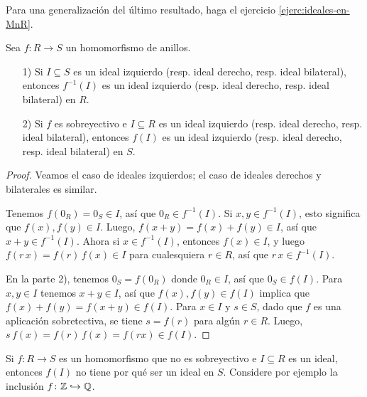 Para una generalización del último resultado, haga el ejercicio
\ref{ejerc:ideales-en-MnR}.

\begin{observacion}
  \label{obs:imagen-y-preimagen-de-un-ideal}
  Sea $f\colon R\to S$ un homomorfismo de anillos.

  \begin{enumerate}
  \item[1)] Si $I \subseteq S$ es un ideal izquierdo (resp. ideal derecho,
    resp. ideal bilateral), entonces $f^{-1} (I)$ es un ideal izquierdo
    (resp. ideal derecho, resp. ideal bilateral) en $R$.

  \item[2)] Si $f$ es sobreyectivo e $I \subseteq R$ es un ideal izquierdo
    (resp. ideal derecho, resp. ideal bilateral), entonces $f (I)$ es un ideal
    izquierdo (resp. ideal derecho, resp. ideal bilateral) en $S$.
  \end{enumerate}

  \begin{proof}
    Veamos el caso de ideales izquierdos; el caso de ideales derechos
    y bilaterales es similar.

    Tenemos $f (0_R) = 0_S \in I$, así que $0_R \in f^{-1} (I)$.
    Si $x,y \in f^{-1} (I)$, esto significa que $f (x), f (y) \in I$. Luego,
    $f (x+y) = f (x) + f (y) \in I$, así que $x+y \in f^{-1} (I)$. Ahora si
    $x\in f^{-1} (I)$, entonces $f (x) \in I$, y luego
    $f (r\,x) = f (r)\,f (x) \in I$ para cualesquiera $r \in R$, así que
    $r\,x \in f^{-1} (I)$.

    En la parte 2), tenemos $0_S = f (0_R)$ donde $0_R \in I$, así que
    $0_S \in f (I)$. Para $x,y \in I$ tenemos $x+y \in I$, así que
    $f (x), f (y) \in f (I)$ implica que $f (x) + f (y) = f (x+y) \in f
    (I)$. Para $x \in I$ y $s \in S$, dado que $f$ es una aplicación
    sobretectiva, se tiene $s = f (r)$ para algún $r\in R$. Luego,
    $s\,f (x) = f (r)\,f (x) = f (rx) \in f (I)$.
  \end{proof}
\end{observacion}

\begin{comentario}
  Si $f\colon R\to S$ es un homomorfismo que no es sobreyectivo e
  $I \subseteq R$ es un ideal, entonces $f (I)$ no tiene por qué ser un ideal
  en $S$. Considere por ejemplo la inclusión $f\colon \mathbb{Z} \hookrightarrow \mathbb{Q}$.
\end{comentario}


